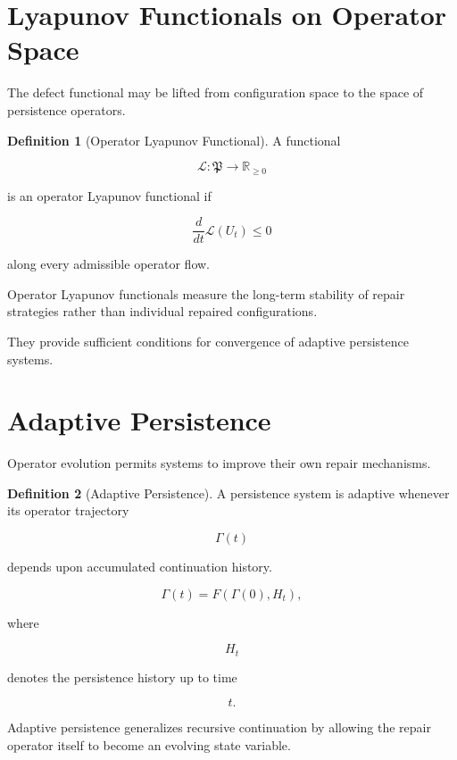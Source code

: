 \documentclass[11pt]{book}
\numberwithin{equation}{chapter}
\theoremstyle{definition}
\newtheorem{definition}{Definition}[chapter]
\theoremstyle{plain}
\begin{document}
\section{Lyapunov Functionals on Operator Space}

The defect functional may be lifted from configuration space to the
space of persistence operators.

\begin{definition}[Operator Lyapunov Functional]

A functional

\[
\mathcal L
:
\mathfrak P
\rightarrow
\mathbb R_{\ge0}
\]

is an operator Lyapunov functional if

\[
\frac{d}{dt}
\mathcal L(U_t)
\le
0
\]

along every admissible operator flow.

\end{definition}

Operator Lyapunov functionals measure the long-term stability of repair
strategies rather than individual repaired configurations.

They provide sufficient conditions for convergence of adaptive
persistence systems.

\section{Adaptive Persistence}

Operator evolution permits systems to improve their own repair
mechanisms.

\begin{definition}[Adaptive Persistence]

A persistence system is adaptive whenever its operator trajectory

\[
\Gamma(t)
\]

depends upon accumulated continuation history.

\[
\Gamma(t)
=
F\!\left(
\Gamma(0),
H_t
\right),
\]

where

\[
H_t
\]

denotes the persistence history up to time

\[
t.
\]

\end{definition}

Adaptive persistence generalizes recursive continuation by allowing the
repair operator itself to become an evolving state variable.
\end{document}
